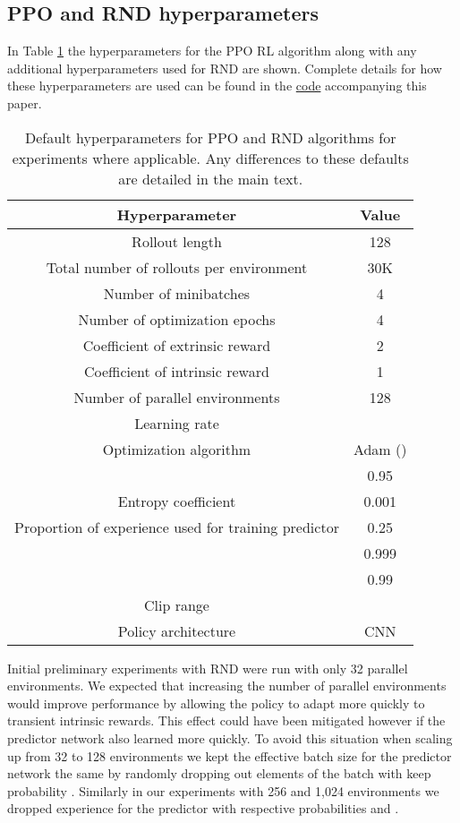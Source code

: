 \documentclass{article} \usepackage[dvipsnames]{xcolor}
\begin{document}
\subsection{PPO and RND hyperparameters}
\label{sec:ppornd_hyperparams}
In Table \ref{table:ppo_rnd_hyperparameters} the hyperparameters for the PPO RL algorithm along with any additional hyperparameters used for RND are shown. Complete details for how these hyperparameters are used can be found in the \href{https://github.com/openai/random-network-distillation}{code} accompanying this paper.

\begin{table}[!ht]
\centering
\begin{tabular}{c | c} 
 Hyperparameter & Value  \\ [0.5ex] 
 \hline
 Rollout length & 128  \\
 Total number of rollouts per environment & 30K  \\
 Number of minibatches & 4  \\
 Number of optimization epochs & 4  \\
 Coefficient of extrinsic reward & 2  \\
 Coefficient of intrinsic reward & 1  \\
 Number of parallel environments & 128  \\
 Learning rate &   \\
 Optimization algorithm & Adam (\citet{kingma2014adam})  \\
  & 0.95 \\
 Entropy coefficient & 0.001 \\
 Proportion of experience used for training predictor & 0.25 \\
  & 0.999 \\
  & 0.99 \\
 Clip range &  \\
 Policy architecture & CNN \\
\end{tabular}
\caption{Default hyperparameters for PPO and RND algorithms for experiments where applicable. Any differences to these defaults are detailed in the main text.}
\label{table:ppo_rnd_hyperparameters}
\end{table}

Initial preliminary experiments with RND were run with only 32 parallel environments. We expected that increasing the number of parallel environments would improve performance by allowing the policy to adapt more quickly to transient intrinsic rewards. This effect could have been mitigated however if the predictor network also learned more quickly. To avoid this situation when scaling up from 32 to 128 environments we kept the effective batch size for the predictor network the same by randomly dropping out elements of the batch with keep probability . Similarly in our experiments with 256 and 1,024 environments we dropped experience for the predictor with respective probabilities  and .
\end{document}
